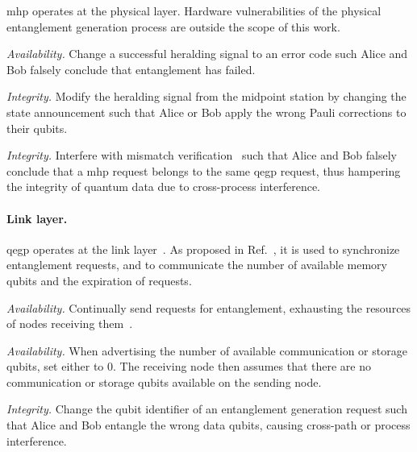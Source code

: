 \acrshort{mhp} operates at the physical layer. Hardware vulnerabilities of the physical entanglement
generation process are outside the scope of this work.

\begin{example}
\textit{Availability.}
Change a successful heralding signal to an error code such Alice and Bob falsely conclude that
entanglement has failed.
\end{example}

\begin{example}
\textit{Integrity.}
Modify the heralding signal from the midpoint station by changing the state announcement such that
Alice or Bob apply the wrong Pauli corrections to their qubits.
\end{example}

\begin{example}
\textit{Integrity.}
Interfere with mismatch verification~\cite{dahlberg_2019_egp, pompili_2022_experimental} such that
Alice and Bob falsely conclude that a \acrshort{mhp} request belongs to the same \acrshort{qegp}
request, thus hampering the integrity of quantum data due to cross-process interference.
\end{example}

\paragraph*{Link layer.}

\acrshort{qegp} operates at the link layer~\cite{dahlberg_2019_egp}. As proposed in
Ref.~\cite{dahlberg_2019_egp}, it is used to synchronize entanglement requests, and to communicate
the number of available memory qubits and the expiration of requests.

\begin{example}
\textit{Availability.}
Continually send requests for entanglement, exhausting the resources of nodes receiving
them~\cite{kozlowski_2019_towards}.
\end{example}

\begin{example}
\textit{Availability.}
When advertising the number of available communication or storage qubits, set either to 0. The
receiving node then assumes that there are no communication or storage qubits available on the
sending node.
\end{example}

\begin{example}
\textit{Integrity.}
Change the qubit identifier of an entanglement generation request such that Alice and Bob entangle
the wrong data qubits, causing cross-path or process interference.
\end{example}

